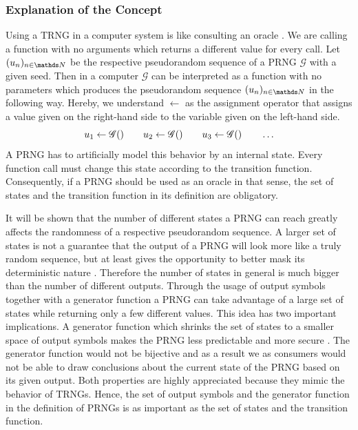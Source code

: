 \documentclass{stdlocal}
\begin{document}
    \subsubsection{Explanation of the Concept}
    Using a TRNG in a computer system is like consulting an oracle \autocite{mueller2012}.
    We are calling a function with no arguments which returns a different value for every call.
    Let $(u_n)_{n\in\setNatural}$ be the respective pseudorandom sequence of a PRNG $\mathscr{G}$ with a given seed.
    Then in a computer $\mathscr{G}$ can be interpreted as a function with no parameters which produces the pseudorandom sequence $(u_n)_{n\in\setNatural}$ in the following way.
    Hereby, we understand $\leftarrow$ as the assignment operator that assigns a value given on the right-hand side to the variable given on the left-hand side.
    \[
      u_1 \leftarrow \mathscr{G}()
      \qquad
      u_2 \leftarrow \mathscr{G}()
      \qquad
      u_3 \leftarrow \mathscr{G}()
      \qquad
      \ldots
    \]
    A PRNG has to artificially model this behavior by an internal state.
    Every function call must change this state according to the transition function.
    Consequently, if a PRNG should be used as an oracle in that sense, the set of states and the transition function in its definition are obligatory.

    It will be shown that the number of different states a PRNG can reach greatly affects the randomness of a respective pseudorandom sequence.
    A larger set of states is not a guarantee that the output of a PRNG will look more like a truly random sequence, but at least gives the opportunity to better mask its deterministic nature \autocite{oneill2014}.
    Therefore the number of states in general is much bigger than the number of different outputs.
    Through the usage of output symbols together with a generator function a PRNG can take advantage of a large set of states while returning only a few different values.
    This idea has two important implications.
    A generator function which shrinks the set of states to a smaller space of output symbols makes the PRNG less predictable and more secure \autocite{oneill2014}.
    The generator function would not be bijective and as a result we as consumers would not be able to draw conclusions about the current state of the PRNG based on its given output.
    Both properties are highly appreciated because they mimic the behavior of TRNGs.
    Hence, the set of output symbols and the generator function in the definition of PRNGs is as important as the set of states and the transition function.
\end{document}
